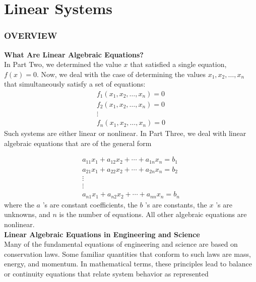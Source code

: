 \documentclass[../main.tex]{subfiles}
\begin{document}
\part{Linear Systems}

\section[OVERVIEW]{OVERVIEW}
\noindent \textbf{What Are Linear Algebraic Equations?}\\

In Part Two, we determined the value $x$ that satisfied a single equation, $f(x)=0$. Now, we deal with the case of determining the values $x_{1}, x_{2}, \ldots, x_{n}$ that simultaneously satisfy a set of equations:
$$
\begin{gathered}
f_{1}\left(x_{1}, x_{2}, \ldots, x_{n}\right)=0 \\
f_{2}\left(x_{1}, x_{2}, \ldots, x_{n}\right)=0 \\
\vdots \\
f_{n}\left(x_{1}, x_{2}, \ldots, x_{n}\right)=0
\end{gathered}
$$
Such systems are either linear or nonlinear. In Part Three, we deal with linear algebraic equations that are of the general form

$$
\begin{gathered}
a_{11} x_{1}+a_{12} x_{2}+\cdots+a_{1 n} x_{n}=b_{1} \\
a_{21} x_{1}+a_{22} x_{2}+\cdots+a_{2 n} x_{n}=b_{2} \\
\vdots \\
\vdots \\
a_{n 1} x_{1}+a_{n 2} x_{2}+\cdots+a_{n n} x_{n}=b_{n}
\end{gathered}
$$
where the $a$ 's are constant coefficients, the $b$ 's are constants, the $x$ 's are unknowns, and $n$ is the number of equations. All other algebraic equations are nonlinear.
\\

\noindent \textbf{Linear Algebraic Equations in Engineering and Science}\\

Many of the fundamental equations of engineering and science are based on conservation laws. Some familiar quantities that conform to such laws are mass, energy, and momentum. In mathematical terms, these principles lead to balance or continuity equations that relate system behavior as represented
\end{document}
